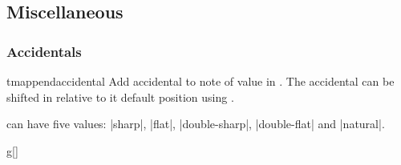 \documentclass[11pt,a4paper]{ltxdoc}
\begin{document}
\begin{dispExample}
\begin{tmsinglestaff}
  \begin{tmstaff*}
  \end{tmstaff*}
\end{tmsinglestaff}
\end{dispExample}
\subsection{Miscellaneous}\label{sec:music-notes:misc}
\subsubsection{Accidentals}\label{sec:music-notes:misc:accidentals}
\begin{docCommand}{tmappendaccidental}{}
  Add accidental  to note of value  in 
  . The accidental can be shifted in relative to it default 
  position using .

   can have five values: |sharp|, |flat|, |double-sharp|, 
  |double-flat| and |natural|.
\end{docCommand}
\begin{dispExample}
\begin{tmsinglestaff}%
  \begin{tmstaff}{g}[]
  \end{tmstaff}%
\end{tmsinglestaff}
\end{dispExample}
\end{document}
